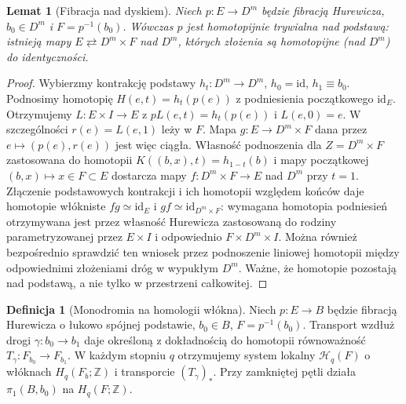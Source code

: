 \documentclass[11pt,a4paper,oneside]{report}
\newcommand{\Z}{\mathbb{Z}}
\newcommand{\id}{\mathrm{id}}
\theoremstyle{plain}
\newtheorem{lemat}[twierdzenie]{Lemat}
\theoremstyle{definition}
\newtheorem{definicja}[twierdzenie]{Definicja}
\theoremstyle{remark}
\begin{document}
\begin{lemat}[Fibracja nad dyskiem]
\label{lem:serre-disk-v5}
Niech $p:E\to D^m$ będzie fibracją Hurewicza, $b_0\in D^m$
i $F=p^{-1}(b_0)$. Wówczas $p$ jest homotopijnie
trywialna \emph{nad podstawą}: istnieją mapy
$E\rightleftarrows D^m\times F$ nad $D^m$,
których złożenia są homotopijne (nad $D^m$) do identyczności.
\end{lemat}
\begin{proof}
Wybierzmy kontrakcję podstawy $h_t:D^m\to D^m$,
$h_0=\id$, $h_1\equiv b_0$. Podnosimy homotopię
$H(e,t)=h_t(p(e))$ z podniesienia początkowego $\id_E$.
Otrzymujemy $L:E\times I\to E$ z $pL(e,t)=h_t(p(e))$
i $L(e,0)=e$. W szczególności $r(e)=L(e,1)$ leży w $F$.
Mapa $g:E\to D^m\times F$ dana przez $e\mapsto(p(e),r(e))$
jest więc ciągła. Własność podnoszenia dla
$Z=D^m\times F$ zastosowana do homotopii
$K((b,x),t)=h_{1-t}(b)$ i mapy początkowej
$(b,x)\mapsto x\in F\subset E$ dostarcza mapy
$f:D^m\times F\to E$ nad $D^m$ przy $t=1$.
Złączenie podstawowych kontrakcji i ich homotopii
względem końców daje homotopie włókniste
$fg\simeq\id_E$ i $gf\simeq\id_{D^m\times F}$:
wymagana homotopia podniesień otrzymywana jest przez
własność Hurewicza zastosowaną do rodziny parametryzowanej
przez $E\times I$ i odpowiednio $F\times D^m\times I$.
Można również bezpośrednio sprawdzić ten wniosek przez
podnoszenie liniowej homotopii między odpowiednimi
złożeniami dróg w wypukłym $D^m$. Ważne, że homotopie
pozostają nad podstawą, a nie tylko w przestrzeni całkowitej.
\end{proof}

\begin{definicja}[Monodromia na homologii włókna]
Niech $p:E\to B$ będzie fibracją Hurewicza o łukowo spójnej
podstawie, $b_0\in B$, $F=p^{-1}(b_0)$.
Transport wzdłuż drogi $\gamma:b_0\to b_1$ daje określoną
z dokładnością do homotopii równoważność
$T_\gamma:F_{b_0}\to F_{b_1}$.
W każdym stopniu $q$ otrzymujemy system lokalny
$\mathcal H_q(F)$ o włóknach $H_q(F_b;\Z)$ i transporcie
$(T_\gamma)_*$. Przy zamkniętej pętli działa
$\pi_1(B,b_0)$ na $H_q(F;\Z)$.
\end{definicja}
\end{document}
